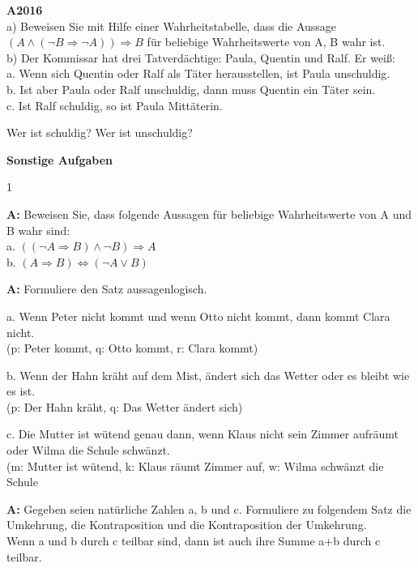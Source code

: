 \documentclass[landscape,twocolumn,a4paper]{article}
\begin{document}
\newpage

\textbf{A2016} \\

a) Beweisen Sie mit Hilfe einer Wahrheitstabelle, dass die Aussage
$(A \land ( \lnot B \Rightarrow \lnot A)) \Rightarrow B$
für beliebige Wahrheitswerte von A, B wahr ist. \\

b) Der Kommissar hat drei Tatverdächtige: Paula, Quentin und Ralf. Er weiß: \\
a. Wenn sich Quentin oder Ralf als Täter herausstellen, ist Paula unschuldig. \\
b. Ist aber Paula oder Ralf unschuldig, dann muss Quentin ein Täter sein. \\
c. Ist Ralf schuldig, so ist Paula Mittäterin.

Wer ist schuldig? Wer ist unschuldig?
\bigskip


\textbf{Sonstige Aufgaben}
\bigskip

\setcounter {y} {1}


\textbf{A:}
Beweisen Sie, dass folgende Aussagen für beliebige Wahrheitswerte von A und B wahr sind: \\

a. $((\lnot A \Rightarrow B) \land \lnot B) \Rightarrow A$ \\
b. $(A \Rightarrow B) \Leftrightarrow (\lnot A \lor B)$
\bigskip {}

\textbf{A:} 
Formuliere den Satz aussagenlogisch.

a. Wenn Peter nicht kommt und wenn Otto nicht kommt, dann kommt Clara nicht. \\
(p: Peter kommt, q: Otto kommt, r: Clara kommt) 

b. Wenn der Hahn kräht auf dem Mist, ändert sich das Wetter oder es bleibt wie es ist. \\
(p: Der Hahn kräht, q: Das Wetter ändert sich)

c. Die Mutter ist wütend genau dann, wenn Klaus nicht sein Zimmer aufräumt oder Wilma die Schule schwänzt. \\
(m: Mutter ist wütend, k: Klaus räumt Zimmer auf, w: Wilma schwänzt die Schule
\bigskip {}

\textbf{A:} 
Gegeben seien natürliche Zahlen a, b und c.
Formuliere zu folgendem Satz die Umkehrung, die Kontraposition und die Kontraposition der Umkehrung. \\
Wenn a und  b durch c teilbar sind, dann ist auch ihre Summe a+b durch c teilbar.
\bigskip {}
\end{document}
